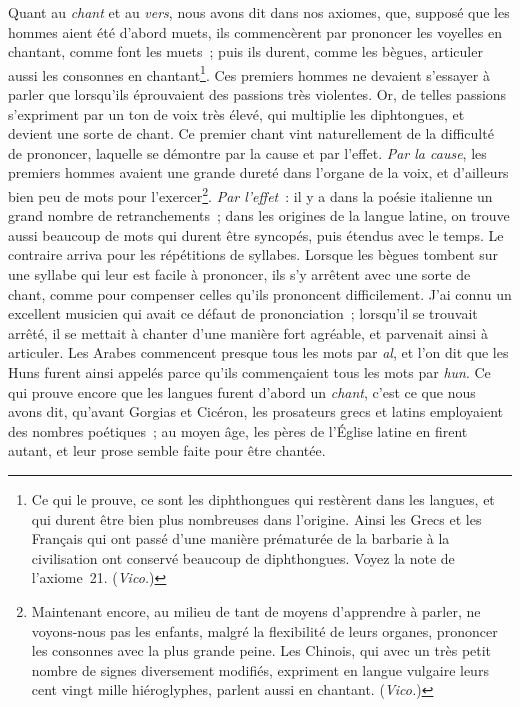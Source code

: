 \documentclass[french,twoside]{book} %
\begin{document}
Quant au {\itshape chant} et au {\itshape vers}, nous avons dit dans nos axiomes, que, supposé que les hommes aient été d’abord muets, ils commencèrent par prononcer les voyelles en chantant, comme font les muets ; puis ils durent, comme les bègues, articuler aussi  les consonnes en chantant\footnote{Ce qui le prouve, ce sont les diphthongues qui restèrent dans les langues, et qui durent être bien plus nombreuses dans l’origine. Ainsi les Grecs et les Français qui ont passé d’une manière prématurée de la barbarie à la civilisation ont conservé beaucoup de diphthongues. Voyez la note de l’axiome 21. ({\itshape Vico.})}. Ces premiers hommes ne devaient s’essayer à parler que lorsqu’ils éprouvaient des passions très violentes. Or, de telles passions s’expriment par un ton de voix très élevé, qui multiplie les diphtongues, et devient une sorte de chant. Ce premier chant vint naturellement de la difficulté de prononcer, laquelle se démontre par la cause et par l’effet. {\itshape Par la cause}, les premiers hommes avaient une grande dureté dans l’organe de la voix, et d’ailleurs bien peu de mots pour l’exercer\footnote{Maintenant encore, au milieu de tant de moyens d’apprendre à parler, ne voyons-nous pas les enfants, malgré la flexibilité de leurs organes, prononcer les consonnes avec la plus grande peine. Les Chinois, qui avec un très petit nombre de signes diversement modifiés, expriment en langue vulgaire leurs cent vingt mille hiéroglyphes, parlent aussi en chantant. ({\itshape Vico.})}. {\itshape Par l’effet} : il y a dans la poésie italienne un grand nombre de retranchements ; dans les origines de la langue latine, on trouve aussi beaucoup de mots qui durent être syncopés, puis étendus avec le temps. Le contraire arriva pour les répétitions de syllabes. Lorsque les bègues tombent sur une syllabe qui leur est facile à prononcer, ils s’y arrêtent avec une sorte de chant, comme pour compenser celles qu’ils prononcent difficilement. J’ai connu un excellent musicien qui avait ce défaut  de prononciation ; lorsqu’il se trouvait arrêté, il se mettait à chanter d’une manière fort agréable, et parvenait ainsi à articuler. Les Arabes commencent presque tous les mots par {\itshape al}, et l’on dit que les Huns furent ainsi appelés parce qu’ils commençaient tous les mots par {\itshape hun}. Ce qui prouve encore que les langues furent d’abord un {\itshape chant}, c’est ce que nous avons dit, qu’avant Gorgias et Cicéron, les prosateurs grecs et latins employaient des nombres poétiques ; au moyen âge, les pères de l’Église latine en firent autant, et leur prose semble faite pour être chantée.\par
\end{document}
